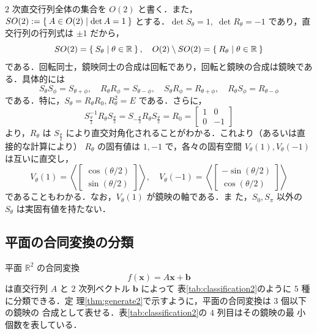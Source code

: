 \documentclass[11pt, uplatex, dvipdfmx, titlepage]{jsarticle}
\theoremstyle{definition}
\begin{document}
$2$ 次直交行列全体の集合を $O(2)$ と書く．また，$SO(2) := \Set{A \in
  O(2) | \det A = 1}$ とする．$\det S_{\theta} =1, \; \det
R_{\theta}=-1$ であり，直交行列の行列式は $\pm 1$ だから，
\[
  SO(2) = \Set{ S_{\theta} | \theta \in \mathbb{R}}, \quad O(2)
  \setminus SO(2)=\Set{ R_{\theta} | \theta \in \mathbb{R}}
\]
である．回転同士，鏡映同士の合成は回転であり，回転と鏡映の合成は鏡映である．具体的には
\[
  S_{\theta} S_{\phi} = S_{\theta+\phi}, \quad R_{\theta} R_{\phi} = S_{\theta-\phi}, \quad
  S_{\theta}R_{\phi}=R_{\theta+\phi}, \quad R_{\theta}S_{\phi} = R_{\theta-\phi}
\]
である．特に，$S_{\theta} = R_{\theta}R_{0}, R_{\theta}^2=E$ である．さらに，
\[
  S_{\frac{\theta}{2}}^{-1} R_{\theta} S_{\frac{\theta}{2}} = S_{-\frac{\theta}{2}} R_{\theta} S_{\frac{\theta}{2}}
  = R_{0} = \left[
    \begin{array}{rr}
      1 & 0\\
      0 & -1
    \end{array}
  \right]
\]
より，$R_{\theta}$ は $S_{\frac{\theta}{2}}$ により直交対角化されることがわかる．これより（あるいは直接的な計算により）
$R_{\theta}$ の固有値は $1, -1$ で，各々の固有空間 $V_{\theta}(1), V_{\theta}(-1)$ は互いに直交し，
\[
  V_{\theta}(1) = \left\langle \left[
    \begin{array}{r}
      \cos (\theta/2)\\
      \sin (\theta/2)
    \end{array}
  \right]\right\rangle, \quad V_{\theta}(-1)= \left\langle \left[
    \begin{array}{r}
      -\sin (\theta/2)\\
      \cos (\theta/2)
    \end{array}
  \right]\right\rangle
\] 
であることもわかる．なお，$V_{\theta}(1)$ が鏡映の軸である．ま
た，$S_0, S_{\pi}$ 以外の $S_{\theta}$ は実固有値を持たない．


\subsection{平面の合同変換の分類}\label{sec:classification2}

平面 $\mathbb{R}^2$ の合同変換
\[
  f(\bm{x}) = A \bm{x} + \bm{b}
\]
は直交行列 $A$ と $2$ 次列ベクトル $\bm{b}$ によって
表\ref{tab:classification2}のように $5$ 種に分類できる．定
理\ref{thm:generate2}で示すように，平面の合同変換は $3$ 個以下の鏡映の
合成として表せる．表\ref{tab:classification2}の $4$ 列目はその鏡映の最
小個数を表している．
\end{document}
